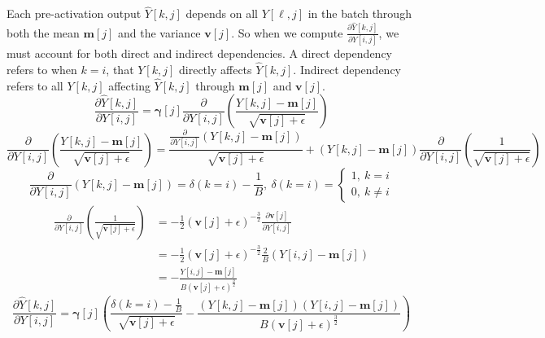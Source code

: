 \documentclass{article}
\begin{document}
{Each pre-activation output $\hat{Y}[k,j]$ depends on all $Y[\ell,j]$ in the batch through both the mean $\textbf{m}[j]$ and the variance $\textbf{v}[j]$. So when we compute $\frac{\partial \hat{Y}[k,j]}{\partial Y[i,j]}$, we must account for both direct and indirect dependencies. A direct dependency refers to when $k=i$, that $Y[k,j]$ directly affects $\hat{Y}[k,j]$. Indirect dependency refers to all $Y[k,j]$ affecting $\hat{Y}[k,j]$ through $\textbf{m}[j]$ and $\textbf{v}[j]$.
\begin{equation}
    \frac{\partial \hat{Y}[k,j]}{\partial Y[i,j]}=  \boldsymbol{\gamma}[j] \frac{\partial}{\partial Y[i,j]} \left(\frac{Y[k,j]- \textbf{m}[j]}{\sqrt{\textbf{v}[j]+ \epsilon}} \right)
\end{equation}
\begin{equation}
    \frac{\partial}{\partial Y[i,j]} \left(\frac{Y[k,j]- \textbf{m}[j]}{\sqrt{\textbf{v}[j]+ \epsilon}} \right)= \frac{\frac{\partial}{\partial Y[i,j]}(Y[k,j]- \textbf{m}[j])}{\sqrt{\textbf{v}[j]+ \epsilon}}+ (Y[k,j]- \textbf{m}[j]) \frac{\partial}{\partial Y[i,j]} \left(\frac{1}{\sqrt{\textbf{v}[j]+ \epsilon}} \right)
\end{equation}
\begin{equation}
    \frac{\partial}{\partial Y[i,j]}(Y[k,j]- \textbf{m}[j])= \delta(k=i)- \frac{1}{B}, \ \delta(k=i)= 
        \begin{cases}
            1, \ k=i\\
            0, \ k \neq i
        \end{cases}
\end{equation}
\begin{equation}
\begin{aligned}
    \frac{\partial}{\partial Y[i,j]} \left(\frac{1}{\sqrt{\textbf{v}[j]+ \epsilon}} \right)&= -\frac{1}{2} (\textbf{v}[j]+ \epsilon)^{-\frac{3}{2}} \frac{\partial \textbf{v}[j]}{\partial Y[i,j]}\\
    &= -\frac{1}{2} (\textbf{v}[j]+ \epsilon)^{-\frac{3}{2}} \frac{2}{B} (Y[i,j]- \textbf{m}[j])\\
    &= -\frac{Y[i,j]- \textbf{m}[j]}{B(\textbf{v}[j]+ \epsilon)^{\frac{3}{2}}}
\end{aligned}
\end{equation}
\begin{equation}
    \frac{\partial \hat{Y}[k,j]}{\partial Y[i,j]}= \boldsymbol{\gamma}[j] \left(\frac{\delta(k=i)- \frac{1}{B}}{\sqrt{\textbf{v}[j]+ \epsilon}}- \frac{(Y[k,j]- \textbf{m}[j])(Y[i,j]- \textbf{m}[j])}{B(\textbf{v}[j]+ \epsilon)^{\frac{3}{2}}}\right)

\end{equation}}
\end{document}
